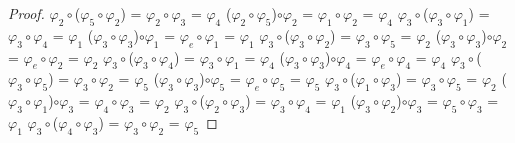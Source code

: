 \documentclass[10pt,a4paper,oneside]{article}
\begin{document}
\begin{proof}
				$\varphi_{2}\circ$($\varphi_{5}\circ\varphi_{2}$) = $\varphi_{2}\circ\varphi_{3}$ = $\varphi_{4}$
				\newline
				($\varphi_{2}\circ\varphi_{5}$)$\circ\varphi_{2}$ = $\varphi_{1}\circ\varphi_{2}$ = $\varphi_{4}$
				\newline
				\newline
				$\varphi_{3}\circ$($\varphi_{3}\circ\varphi_{1}$) = $\varphi_{3}\circ\varphi_{4}$ = $\varphi_{1}$
				\newline
				($\varphi_{3}\circ\varphi_{3}$)$\circ\varphi_{1}$ = $\varphi_{e}\circ\varphi_{1}$ = $\varphi_{1}$
				\newline
				\newline
				$\varphi_{3}\circ$($\varphi_{3}\circ\varphi_{2}$) = $\varphi_{3}\circ\varphi_{5}$ = $\varphi_{2}$
				\newline
				($\varphi_{3}\circ\varphi_{3}$)$\circ\varphi_{2}$ = $\varphi_{e}\circ\varphi_{2}$ = $\varphi_{2}$
				\newline
				\newline
				$\varphi_{3}\circ$($\varphi_{3}\circ\varphi_{4}$) = $\varphi_{3}\circ\varphi_{1}$ = $\varphi_{4}$
				\newline
				($\varphi_{3}\circ\varphi_{3}$)$\circ\varphi_{4}$ = $\varphi_{e}\circ\varphi_{4}$ = $\varphi_{4}$
				\newline
				\newline
				$\varphi_{3}\circ$($\varphi_{3}\circ\varphi_{5}$) = $\varphi_{3}\circ\varphi_{2}$ = $\varphi_{5}$
				\newline
				($\varphi_{3}\circ\varphi_{3}$)$\circ\varphi_{5}$ = $\varphi_{e}\circ\varphi_{5}$ = $\varphi_{5}$
				\newline
				\newline
				$\varphi_{3}\circ$($\varphi_{1}\circ\varphi_{3}$) = $\varphi_{3}\circ\varphi_{5}$ = $\varphi_{2}$
				\newline
				($\varphi_{3}\circ\varphi_{1}$)$\circ\varphi_{3}$ = $\varphi_{4}\circ\varphi_{3}$ = $\varphi_{2}$
				\newline
				\newline
				$\varphi_{3}\circ$($\varphi_{2}\circ\varphi_{3}$) = $\varphi_{3}\circ\varphi_{4}$ = $\varphi_{1}$
				\newline
				($\varphi_{3}\circ\varphi_{2}$)$\circ\varphi_{3}$ = $\varphi_{5}\circ\varphi_{3}$ = $\varphi_{1}$
				\newline
				\newline
				$\varphi_{3}\circ$($\varphi_{4}\circ\varphi_{3}$) = $\varphi_{3}\circ\varphi_{2}$ = $\varphi_{5}$

\end{proof}
\end{document}
